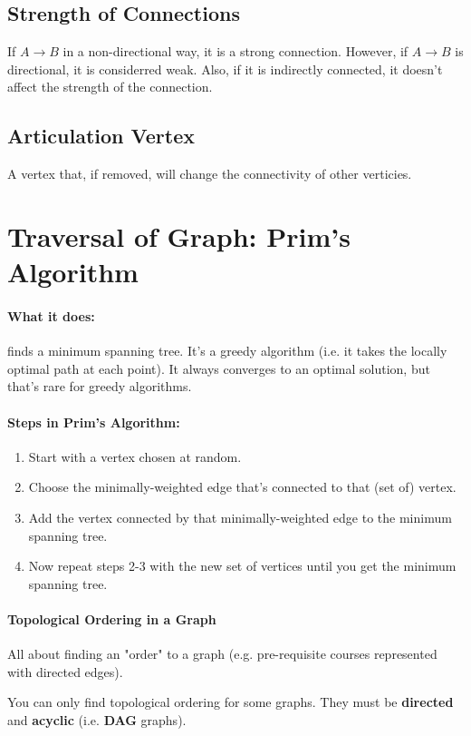 \documentclass[a4paper,12pt]{report}
\begin{document}
\subsection{Strength of Connections}
If $A \to B$ in a non-directional way, it is a strong connection. However, if $A \to B$ is directional, it is considerred weak. Also, if it is indirectly connected, it doesn't affect the strength of the connection.

\subsection{Articulation Vertex}
A vertex that, if removed, will change the connectivity of other verticies.

\section{Traversal of Graph: Prim's Algorithm}
\paragraph{What it does: } finds a minimum spanning tree. It's a greedy algorithm (i.e. it takes the locally optimal path at each point). It always converges to an optimal solution, but that's rare for greedy algorithms. 

\paragraph{Steps in Prim's Algorithm: }
\begin{enumerate}
\item Start with a vertex chosen at random.
\item Choose the minimally-weighted edge that's connected to that (set of) vertex.
\item Add the vertex connected by that minimally-weighted edge to the minimum spanning tree.
\item Now repeat steps 2-3 with the new set of vertices until you get the minimum spanning tree.
\end{enumerate}

\paragraph{Topological Ordering in a Graph}
All about finding an "order" to a graph (e.g. pre-requisite courses represented with directed edges).

You can only find topological ordering for some graphs. They must be \textbf{directed} and \textbf{acyclic} (i.e. \textbf{DAG} graphs).
\end{document}
